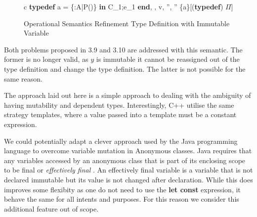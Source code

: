 \documentclass[a4paper,12pt]{report}
\begin{document}
\begin{figure}[H]
  \begin{center}
    \begin{tabular}{c}
      {\langle \textbf{typedef } a = \{\upsilon :A\text{ }|\text{ }P(\upsilon)\} \textbf{ in }C_1;e_1\textbf{ end}, 
      \sigma, \tau \rangle \Longrightarrow 
        \langle v, \sigma'', \tau'' \setminus \{a\}\rangle}[(\textbf{typedef}) $\Pi$]
    \end{tabular}
  \end{center}
  \caption{Operational Semantics Refinement Type Definition with Immutable Variable}
\end{figure}

\par
Both problems proposed in 3.9 and 3.10 are addressed with this semantic. The 
former is no longer valid, as $y$ is immutable it cannot be reassigned out of 
the type definition and change the type definition. The latter is not possible 
for the same reason.

\par
The approach laid out here is a simple approach to dealing with the ambiguity of 
having mutability and dependent types. Interestingly, C++ utilise the same 
strategy templates, where a value passed into a template must be a constant 
expression. 

\par
We could potentially adapt a clever approach used by the Java programming 
language to overcome variable mutation in Anonymous classes. Java requires that 
any variables accessed by an anonymous class that is part of 
its enclosing scope to be final or \textit{effectively final} 
\cite{effectFinal}. An effectively final variable is a variable that is not 
declared immutable but its value is not changed after declaration. While this 
does improves some flexibity as one do not need to use the \textbf{let const} 
expression, it behave the same for all intents and purposes. For this reason we 
consider this additional feature out of scope. 
\end{document}
